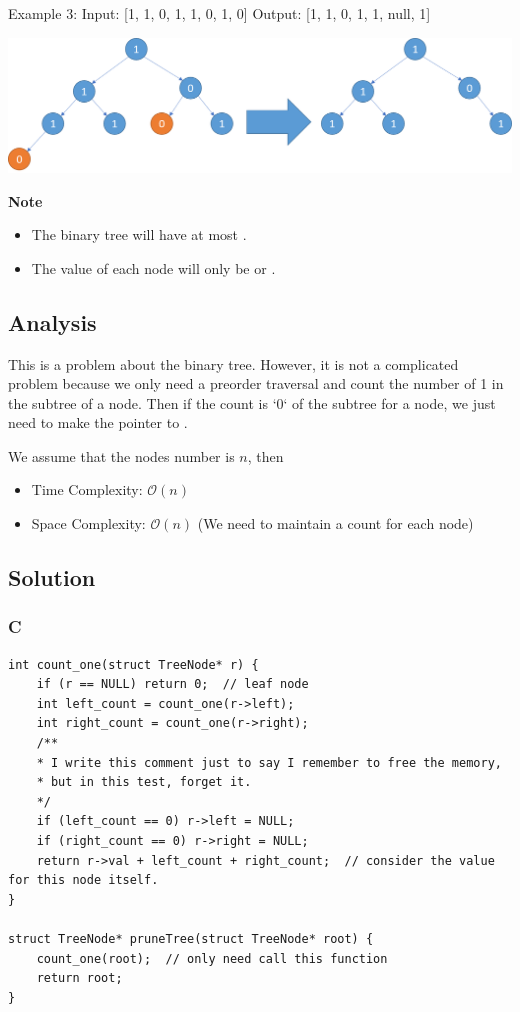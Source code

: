 \begin{example}
\begin{multilinecode}
Example 3:
Input: [1, 1, 0, 1, 1, 0, 1, 0]
Output: [1, 1, 0, 1, 1, null, 1]
\end{multilinecode}
\includegraphics*[width=14cm]{figs/algo_814_3}
\end{example}

\textbf{Note}
\begin{itemize}
\item The binary tree will have at most .
\item The value of each node will only be  or .
\end{itemize}

\subsection*{Analysis}
This is a problem about the binary tree. However, it is not a complicated problem because we only need a preorder traversal and count the number of 1 in the subtree of a node. Then if the count is `0` of the subtree for a node, we just need to make the pointer to .

We assume that the nodes number is $n$, then
\begin{itemize}
\item Time Complexity: $\mathcal{O}(n)$
\item Space Complexity: $\mathcal{O}(n)$ (We need to maintain a count for each node)
\end{itemize}

\subsection*{Solution}
\subsubsection*{C}
\begin{verbatim}
int count_one(struct TreeNode* r) {
    if (r == NULL) return 0;  // leaf node
    int left_count = count_one(r->left);
    int right_count = count_one(r->right);
    /**
    * I write this comment just to say I remember to free the memory,
    * but in this test, forget it.
    */
    if (left_count == 0) r->left = NULL;
    if (right_count == 0) r->right = NULL;
    return r->val + left_count + right_count;  // consider the value for this node itself.
}

struct TreeNode* pruneTree(struct TreeNode* root) {
    count_one(root);  // only need call this function
    return root;
}
\end{verbatim}

\newpage

